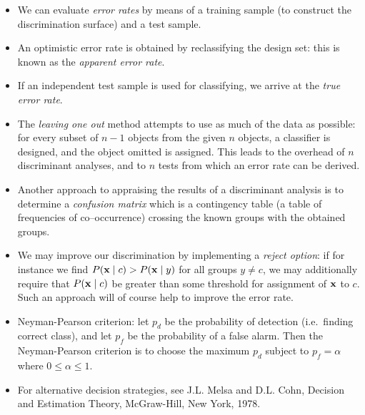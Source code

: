 \documentclass[a4,dvips]{seminar}
\newcommand{\heading}[1]{%
  \begin{center}
    \large\bf
    \shadowbox{#1}%
  \end{center}
  \vspace{1ex minus 1ex}}
\begin{document}
\begin{slide}
\textcolor {reddish} {\heading{Practical Remarks}}
\begin{itemize}
\item We can evaluate {\sl error rates} by means of a training sample (to
construct the discrimination surface) and a test sample.  
\item An optimistic
error rate is obtained by reclassifying the design set: this is
known as the {\sl apparent error rate}.  
\item If an independent test sample
is used for classifying, we arrive at the {\sl true error rate}.  
\item The
{\sl leaving one out} method attempts to use as much of the data as
possible: for every subset of $n-1$ objects from the given $n$ objects,
a classifier is designed, and the object omitted is assigned.  This
leads to the overhead of $n$ discriminant analyses, and to $n$ tests
from which an error rate can be derived. 
\item Another approach to 
appraising the results of a discriminant analysis is to determine a
{\sl confusion matrix} which is a contingency table (a table of
frequencies of co--occurrence) crossing the known groups with the
obtained groups.  
\item We may improve our discrimination by implementing a 
{\sl reject option}: if for instance we find $ P({\bf x} \mid c) >
P({\bf x} \mid y)$ for all groups $y \neq c$, we may additionally
require that $P({\bf x} \mid c)$ be greater than some threshold for
assignment of ${\bf x}$ to $c$.  Such an approach will of course help
to improve the error rate.
\item Neyman-Pearson criterion: let $p_d$ be the probability of detection
(i.e.\ finding correct class), and let $p_f$ be the probability of a 
false alarm.  Then the Neyman-Pearson criterion is to choose the maximum 
$p_d$ subject to $p_f = \alpha$ where $0 \leq \alpha \leq 1$.  
\item For alternative decision strategies, see J.L. Melsa and D.L. Cohn, 
Decision and Estimation Theory,  McGraw-Hill, New York, 1978.
\end{itemize}
\end{slide}
\end{document}
